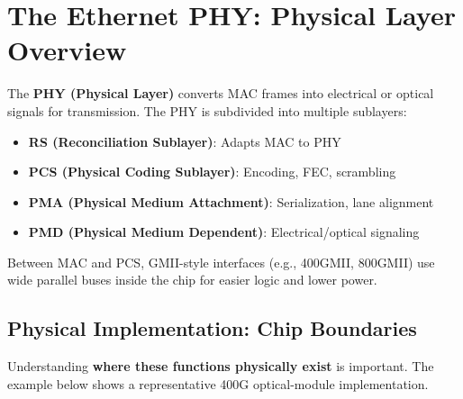 \documentclass[openany]{tufte-book}
\begin{document}
\section{The Ethernet PHY: Physical Layer Overview}

The \textbf{PHY (Physical Layer)} converts MAC frames into electrical or optical signals for transmission. The PHY is subdivided into multiple sublayers:

\begin{itemize}
\item \textbf{RS (Reconciliation Sublayer)}: Adapts MAC to PHY
\item \textbf{PCS (Physical Coding Sublayer)}: Encoding, FEC, scrambling
\item \textbf{PMA (Physical Medium Attachment)}: Serialization, lane alignment
\item \textbf{PMD (Physical Medium Dependent)}: Electrical/optical signaling
\end{itemize}

Between MAC and PCS, GMII-style interfaces (e.g., 400GMII, 800GMII) use wide parallel buses inside the chip for easier logic and lower power.

\subsection{Physical Implementation: Chip Boundaries}

Understanding \textbf{where these functions physically exist} is important. The example below shows a representative 400G optical-module implementation.
\end{document}
